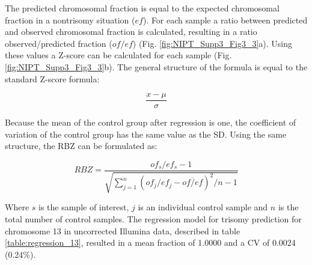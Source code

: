 \noindent The predicted chromosomal fraction is equal to the expected chromosomal fraction in a nontrisomy situation ($ef$). For each sample a ratio between predicted and observed chromosomal fraction is calculated, resulting in a ratio observed/predicted fraction ($of/ef$) (Fig. \ref{fig:NIPT_Supp3_Fig3_3}a).
Using these values a Z-score can be calculated for each sample (Fig. \ref{fig:NIPT_Supp3_Fig3_3}b). The general structure of the formula is equal to the standard Z-score formula:

\begin{equation*}
\frac{x - \mu}{\sigma}
\end{equation*}

\noindent Because the mean of the control group after regression is one, the coefficient of variation of the control group has the same value as the SD. Using the same structure, the RBZ can be formulated as:

\begin{equation*}
RBZ = \frac{of_s / ef_s - 1}{\sqrt{\sum^n_{j=1}(of_j / ef_j - \overline{of/ef})^2 / n - 1}}
\end{equation*}

\noindent Where $s$ is the sample of interest, $j$ is an individual control sample and $n$ is the total number of control samples. 
The regression model for trisomy prediction for chromosome 13 in uncorrected Illumina data, described in table \ref{table:regression_13}, resulted in a mean fraction of 1.0000 and a CV of 0.0024 (0.24\%).

